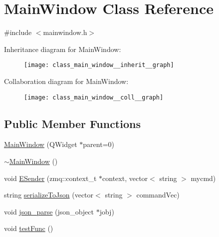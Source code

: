 \hypertarget{class_main_window}{\section{Main\-Window Class Reference}
\label{class_main_window}
}


{\ttfamily \#include $<$mainwindow.\-h$>$}



Inheritance diagram for Main\-Window\-:
\nopagebreak
\begin{figure}[H]
\begin{center}
\leavevmode
\texttt{[image: class\_main\_window\_\_inherit\_\_graph]}
\end{center}
\end{figure}


Collaboration diagram for Main\-Window\-:
\nopagebreak
\begin{figure}[H]
\begin{center}
\leavevmode
\texttt{[image: class\_main\_window\_\_coll\_\_graph]}
\end{center}
\end{figure}
\subsection*{Public Member Functions}
\begin{DoxyCompactItemize}
\item 
\hyperlink{class_main_window_a8b244be8b7b7db1b08de2a2acb9409db}{Main\-Window} (Q\-Widget $\ast$parent=0)
\item 
\hyperlink{class_main_window_ae98d00a93bc118200eeef9f9bba1dba7}{$\sim$\-Main\-Window} ()
\item 
void \hyperlink{class_main_window_a3d5cb165efb53da512f94288d9257168}{E\-Sender} (zmq\-::context\-\_\-t $\ast$context, vector$<$ string $>$ mycmd)
\item 
string \hyperlink{class_main_window_a92901009572885892658ab2e8d7bb191}{serialize\-To\-Json} (vector$<$ string $>$ command\-Vec)
\item 
void \hyperlink{class_main_window_a9bc89dd1034e410e99a9e3f82cb032b3}{json\-\_\-parse} (json\-\_\-object $\ast$jobj)
\item 
void \hyperlink{class_main_window_ae4b6bf5d06819fab861e9e99b5a88699}{test\-Func} ()
\end{DoxyCompactItemize}


